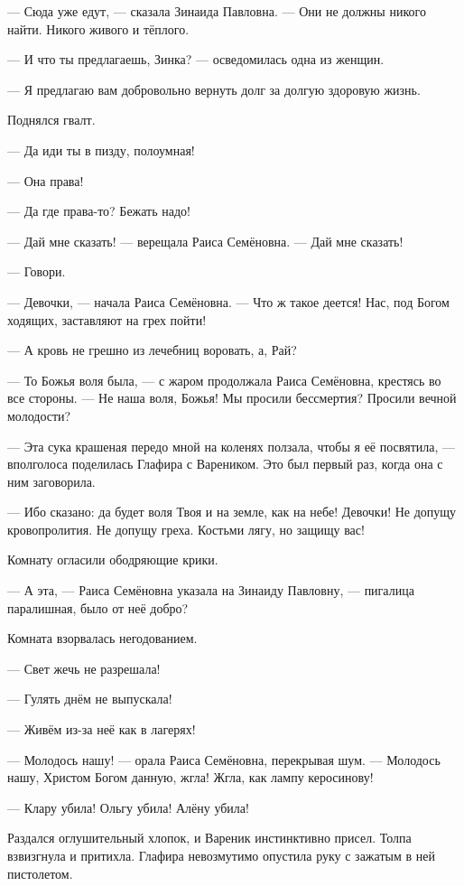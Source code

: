 \textspace

--- Сюда уже едут, --- сказала Зинаида Павловна.
--- Они не должны никого найти.
Никого живого и тёплого.

--- И что ты предлагаешь, Зинка? --- осведомилась одна из женщин.

--- Я предлагаю вам добровольно вернуть долг за долгую здоровую жизнь.

Поднялся гвалт.

--- Да иди ты в пизду, полоумная!

--- Она права!

--- Да где права-то?
Бежать надо!

--- Дай мне сказать! --- верещала Раиса Семёновна.
--- Дай мне сказать!

--- Говори.

--- Девочки, --- начала Раиса Семёновна.
--- Что ж такое деется!
Нас, под Богом ходящих, заставляют на грех пойти!

--- А кровь не грешно из лечебниц воровать, а, Рай?

--- То Божья воля была, --- с жаром продолжала Раиса Семёновна, крестясь во все стороны.
--- Не наша воля, Божья!
Мы просили бессмертия?
Просили вечной молодости?

--- Эта сука крашеная передо мной на коленях ползала, чтобы я её посвятила, --- вполголоса поделилась Глафира с Вареником.
Это был первый раз, когда она с ним заговорила.

--- Ибо сказано: да будет воля Твоя и на земле, как на небе!
Девочки!
Не допущу кровопролития.
Не допущу греха.
Костьми лягу, но защищу вас!

Комнату огласили ободряющие крики.

--- А эта, --- Раиса Семёновна указала на Зинаиду Павловну, --- пигалица паралишная, было от неё добро?

Комната взорвалась негодованием.

--- Свет жечь не разрешала!

--- Гулять днём не выпускала!

--- Живём из-за неё как в лагерях!

--- Молодось нашу! --- орала Раиса Семёновна, перекрывая шум.
--- Молодось нашу, Христом Богом данную, жгла!
Жгла, как лампу керосинову!

--- Клару убила!
Ольгу убила!
Алёну убила!

Раздался оглушительный хлопок, и Вареник инстинктивно присел.
Толпа взвизгнула и притихла.
Глафира невозмутимо опустила руку с зажатым в ней пистолетом.

